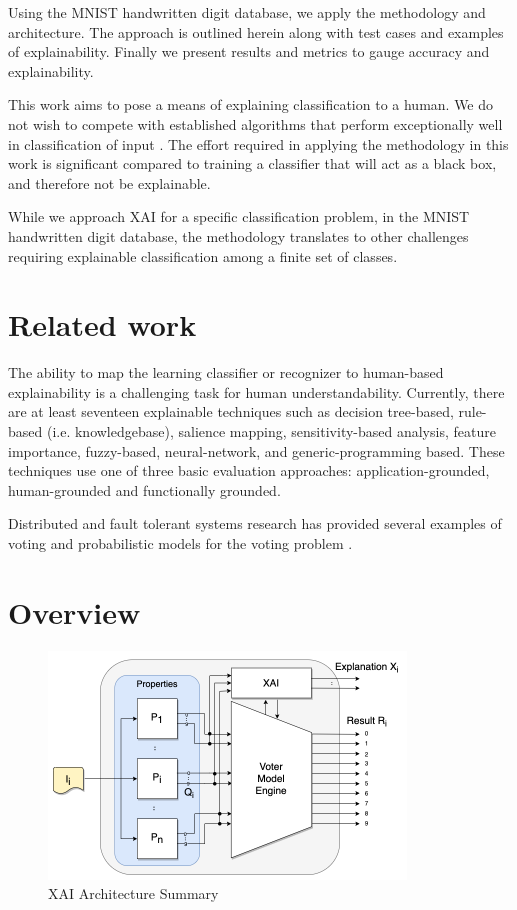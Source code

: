 \documentclass[conference]{IEEEtran}
\begin{document}
Using the MNIST handwritten digit database, we apply the methodology and architecture.  The approach is outlined herein along with test cases and examples of explainability.  Finally we present results and metrics to gauge accuracy and explainability.

This work aims to pose a means of explaining classification to a human.  We do not wish to compete with established algorithms that perform exceptionally well in classification of input \cite{keysers07} \cite{lecun98} \cite{schm2012}.  The effort required in applying the methodology in this work is significant compared to training a classifier that will act as a black box, and therefore not be explainable.

While we approach XAI for a specific classification problem, in the MNIST handwritten digit database, the methodology translates to other challenges requiring explainable classification among a finite set of classes.

\section{Related work}

The ability to map the learning classifier or recognizer to human-based explainability is a challenging task for human understandability.  Currently, there are at least seventeen explainable techniques such as
decision tree-based, rule-based (i.e. knowledgebase), salience mapping,
sensitivity-based analysis, feature importance, fuzzy-based, neural-network, and generic-programming based.  These techniques use one of three basic evaluation approaches: application-grounded, human-grounded and functionally grounded. \cite{BlackBox18} \cite{Arrieta2020ExplainableAI} \cite{Survey18} \cite{Fuzzy19} \cite{Hagras18}  \cite{GP18}

Distributed and fault tolerant systems research has provided several examples of voting \cite{avizienis} and probabilistic models for the voting problem \cite{blough}.

\section{Overview}

 \begin{figure}[htbp]
\centerline{\includegraphics[width=95mm]{./images/voting_prop_nn_2.png}}
\caption{XAI Architecture Summary}
\label{voting}
\end{figure}
\end{document}

